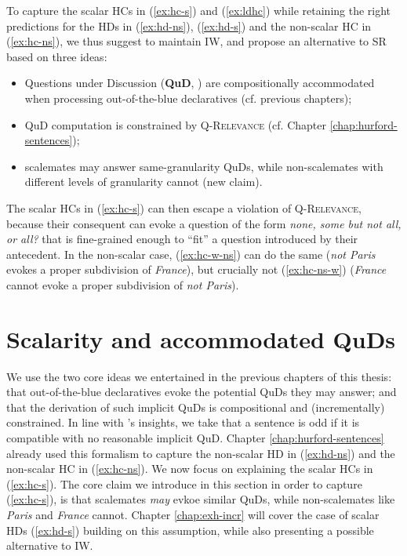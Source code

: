 	To capture the scalar HCs in (\ref{ex:hc-s}) and (\ref{ex:ldhc}) while retaining the right predictions for the HDs in (\ref{ex:hd-ns}), (\ref{ex:hd-s}) and the non-scalar HC in (\ref{ex:hc-ns}), we thus suggest to maintain IW, and propose an alternative to SR based on three ideas:
	\begin{itemize}
		\item Questions under Discussion (\textbf{QuD}, \cite{VanKuppevelt1995,Roberts1996}) are compositionally accommodated when processing out-of-the-blue declaratives (cf. previous chapters);
		\item QuD computation is constrained by \textsc{Q-Relevance} (cf. Chapter \ref{chap:hurford-sentences});
		\item scalemates may answer same-granularity QuDs, while non-scalemates with different levels of granularity cannot (new claim).
	\end{itemize}
	The scalar HCs in (\ref{ex:hc-s}) can then escape a violation of \textsc{Q-Relevance}, because their consequent can evoke a question of the form \textit{none, some but not all, or all?} that is fine-grained enough to ``fit'' a question introduced by their antecedent. In the non-scalar case, (\ref{ex:hc-w-ns}) can do the same (\textit{not Paris} evokes a proper subdivision of \textit{France}), but crucially not (\ref{ex:hc-ns-w}) (\textit{France} cannot evoke a proper subdivision of \textit{not Paris}).
	
	
	
	\section{Scalarity and accommodated QuDs}
	We use the two core ideas we entertained in the previous chapters of this thesis: that out-of-the-blue declaratives evoke the potential QuDs they may answer; and that the derivation of such implicit QuDs is compositional and (incrementally) constrained. In line with \citet{Katzir2015}'s insights, we take that  a sentence is odd if it is compatible with no reasonable implicit QuD. Chapter \ref{chap:hurford-sentences} already used this formalism to capture the non-scalar HD in (\ref{ex:hd-ns}) and the non-scalar HC in (\ref{ex:hc-ns}). We now focus on explaining the scalar HCs in (\ref{ex:hc-s}). The core claim we introduce in this section in order to capture (\ref{ex:hc-s}), is that scalemates \textit{may} evkoe similar QuDs, while non-scalemates like \textit{Paris} and \textit{France} cannot. Chapter \ref{chap:exh-incr} will cover the case of scalar HDs (\ref{ex:hd-s}) building on this assumption, while also presenting a possible alternative to IW.
	
